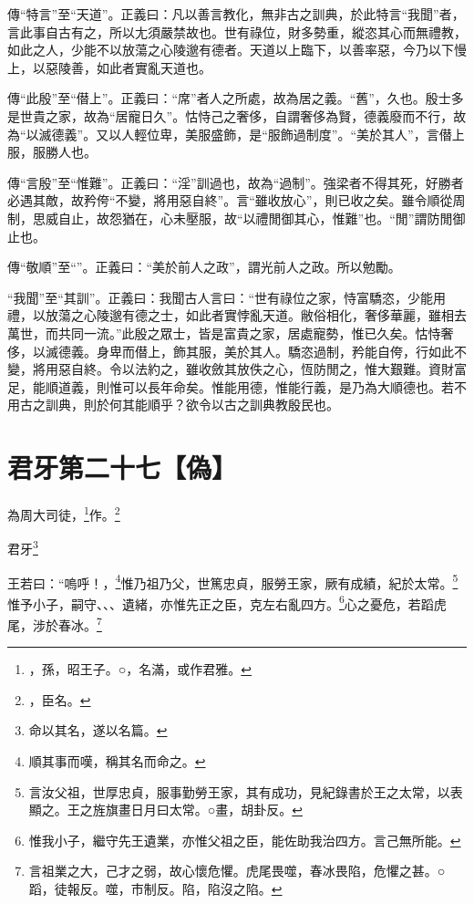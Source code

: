{\noindent\zhuan{}\fzbyks 傳“特言”至“天道”。正義曰：凡以善言教化，無非古之訓典，於此特言“我聞”者，言此事自古有之，所以尢須嚴禁故也。世有祿位，財多勢重，縱恣其心而無禮教，如此之人，少能不以放蕩之心陵邈有德者。天道以上臨下，以善率惡，今乃以下慢上，以惡陵善，如此者實亂天道也。 \par}

{\noindent\zhuan{}\fzbyks 傳“此殷”至“僣上”。正義曰：“席”者人之所處，故為居之義。“舊”，久也。殷士多是世貴之家，故為“居寵日久”。怙恃己之奢侈，自謂奢侈為賢，德義廢而不行，故為“以滅德義”。又以人輕位卑，美服盛飾，是“服飾過制度”。“美於其人”，言僣上服，服勝人也。 \par}

{\noindent\zhuan{}\fzbyks 傳“言殷”至“惟難”。正義曰：“淫”訓過也，故為“過制”。強梁者不得其死，好勝者必遇其敵，故矜侉“不變，將用惡自終”。言“雖收放心”，則已收之矣。雖令順從周制，思威自止，故怨猶在，心未壓服，故“以禮閒御其心，惟難”也。“閒”謂防閒御止也。 \par}

{\noindent\zhuan{}\fzbyks 傳“敬順”至“”。正義曰：“美於前人之政”，謂光前人之政。所以勉勵。 \par}

{\noindent\shu{}\fzkt “我聞”至“其訓”。正義曰：我聞古人言曰：“世有祿位之家，恃富驕恣，少能用禮，以放蕩之心陵邈有德之士，如此者實悖亂天道。敝俗相化，奢侈華麗，雖相去萬世，而共同一流。”此殷之眾士，皆是富貴之家，居處寵勢，惟已久矣。怙恃奢侈，以滅德義。身卑而僣上，飾其服，美於其人。驕恣過制，矜能自侉，行如此不變，將用惡自終。令以法約之，雖收斂其放佚之心，恆防閒之，惟大艱難。資財富足，能順道義，則惟可以長年命矣。惟能用德，惟能行義，是乃為大順德也。若不用古之訓典，則於何其能順乎？欲令以古之訓典教殷民也。 \par}

\section{君牙第二十七【偽】}


為周大司徒，\footnote{，孫，昭王子。○，名滿，或作君雅。}作。\footnote{，臣名。}

君牙\footnote{命以其名，遂以名篇。}

王若曰：“嗚呼！，\footnote{順其事而嘆，稱其名而命之。}惟乃祖乃父，世篤忠貞，服勞王家，厥有成績，紀於太常。\footnote{言汝父祖，世厚忠貞，服事勤勞王家，其有成功，見紀錄書於王之太常，以表顯之。王之旌旗畫日月曰太常。○畫，胡卦反。}惟予小子，嗣守、、、遺緒，亦惟先正之臣，克左右亂四方。\footnote{惟我小子，繼守先王遺業，亦惟父祖之臣，能佐助我治四方。言己無所能。}心之憂危，若蹈虎尾，涉於春冰。\footnote{言祖業之大，己才之弱，故心懷危懼。虎尾畏噬，春冰畏陷，危懼之甚。○蹈，徒報反。噬，市制反。陷，陷沒之陷。}


